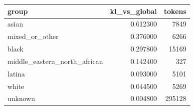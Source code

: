 \begin{tabular}{lrr}
\toprule
group & kl_vs_global & tokens \\
\midrule
asian & 0.612300 & 7849 \\
mixed_or_other & 0.376000 & 6266 \\
black & 0.297800 & 15169 \\
middle_eastern_north_african & 0.142400 & 327 \\
latina & 0.093000 & 5101 \\
white & 0.044500 & 5269 \\
unknown & 0.004800 & 295128 \\
\bottomrule
\end{tabular}
